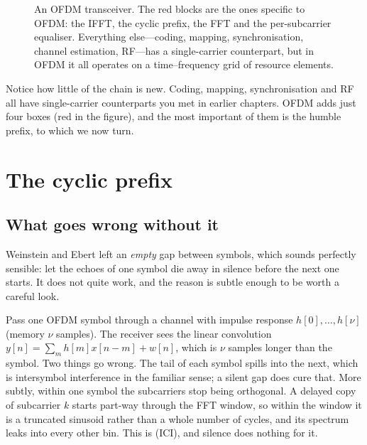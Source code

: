 \begin{figure}[htbp]
\caption{An OFDM transceiver. The red blocks are the ones specific to OFDM: the IFFT, the cyclic prefix,
the FFT and the per-subcarrier equaliser. Everything else---coding, mapping, synchronisation,
channel estimation, RF---has a single-carrier counterpart, but in OFDM it all operates on a
time--frequency grid of resource elements.}
\label{fig:ch17_chain}
\end{figure}

Notice how little of the chain is new. Coding, mapping, synchronisation and RF all have
single-carrier counterparts you met in earlier chapters. OFDM adds just four boxes (red in the
figure), and the most important of them is the humble prefix, to which we now turn.

\section{The cyclic prefix}
\label{sec:ch17:cp}

\subsection{What goes wrong without it}

Weinstein and Ebert left an \emph{empty} gap between symbols, which sounds perfectly sensible: let
the echoes of one symbol die away in silence before the next one starts. It does not quite work,
and the reason is subtle enough to be worth a careful look.

Pass one OFDM symbol through a channel with impulse response $h[0],\dots,h[\nu]$ (memory $\nu$
samples). The receiver sees the linear convolution $y[n]=\sum_mh[m]x[n-m]+w[n]$, which is $\nu$
samples longer than the symbol. Two things go wrong. The tail of each symbol spills into the next,
which is intersymbol interference in the familiar sense; a silent gap does cure that. More subtly,
within one symbol the subcarriers stop being orthogonal. A delayed copy of subcarrier $k$ starts
part-way through the FFT window, so within the window it is a truncated sinusoid rather than a
whole number of cycles, and its spectrum leaks into every other bin. This is  (ICI), and silence does nothing for it.

